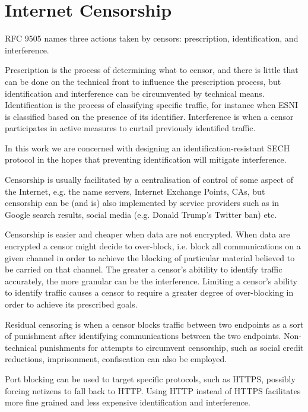 
\section{Internet Censorship}

RFC 9505 \citep{rfc9505} names three actions taken by censors: prescription, identification, and interference.

Prescription is the process of determining what to censor, and there is little that can
be done on the technical front to influence the prescription process,
but identification and interference can be circumvented by technical means.
Identification is the process of classifying specific traffic,
for instance when \ac{ESNI} is
classified based on the presence of its  identifier.
Interference is when a censor participates in
active measures to curtail previously identified traffic.

In this work we are concerned with designing
an identification-resistant \ac{SECH} protocol in the hopes that 
preventing identification will mitigate interference.

Censorship is usually facilitated by a centralisation of control of some aspect of the Internet, e.g. the name servers, Internet Exchange Points, CAs, but censorship can be (and is) also implemented by service providers such as in Google search results, social media (e.g. Donald Trump's Twitter ban) etc.

Censorship is easier and cheaper when data are not encrypted. When data are encrypted a censor might decide to over-block,
i.e. block all communications on a given channel
in order to achieve the blocking of
particular material believed to be
carried on that channel.
The greater a censor's abitility to identify traffic accurately,
the more granular can be the interference.
Limiting a censor's ability to identify traffic
causes a censor to require a greater degree of over-blocking in order
to achieve its prescribed goals.

Residual censoring is when a censor blocks traffic between two endpoints as a sort of punishment after identifying communications between the two endpoints.
Non-technical punishments for attempts to circumvent censorship, such as social credit reductions, imprisonment, confiscation can also be employed.

Port blocking can be used to target specific protocols, such as \ac{HTTPS}, possibly forcing netizens to fall back to \ac{HTTP}.
Using \ac{HTTP} instead of \ac{HTTPS} facilitates more fine grained and less expensive identification and interference.

